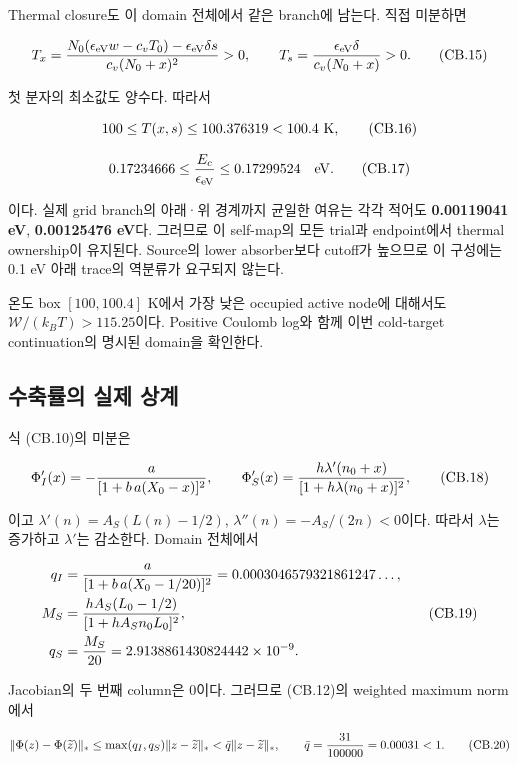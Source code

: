 \documentclass[11pt,a4paper]{article}
\begin{document}
Thermal closure도 이 domain 전체에서 같은 branch에 남는다. 직접 미분하면

\[
 T_x={N_0(\epsilon_{\rm eV}w-c_vT_0)
                  -\epsilon_{\rm eV}\delta s\over c_v(N_0+x)^2}>0,
 \qquad
 T_s={\epsilon_{\rm eV}\delta\over c_v(N_0+x)}>0.
 \tag{CB.15}
\]

첫 분자의 최소값도 양수다. 따라서

\[
 100\le T(x,s)\le100.376319<100.4\ {\rm K},
 \tag{CB.16}
\]

\[
 0.17234666
 \le {E_c\over\epsilon_{\rm eV}}
 \le0.17299524\quad {\rm eV}.
 \tag{CB.17}
\]

이다. 실제 grid branch의 아래·위 경계까지 균일한 여유는 각각 적어도 \textbf{0.00119041 eV}, \textbf{0.00125476 eV}다. 그러므로 이 self-map의 모든 trial과 endpoint에서 thermal ownership이 유지된다. Source의 lower absorber보다 cutoff가 높으므로 이 구성에는 0.1 eV 아래 trace의 역분류가 요구되지 않는다.

온도 box \([100,100.4]\) K에서 가장 낮은 occupied active node에 대해서도 \(\mathcal W/(k_BT)>115.25\)이다. Positive Coulomb log와 함께 이번 cold-target continuation의 명시된 domain을 확인한다.

\hypertarget{uxc218uxcd95uxb960uxc758-uxc2e4uxc81c-uxc0c1uxacc4}{%
\subsection{수축률의 실제 상계}\label{uxc218uxcd95uxb960uxc758-uxc2e4uxc81c-uxc0c1uxacc4}}

식 (CB.10)의 미분은

\[
 \Phi_I'(x)=-{a\over[1+b\,a(X_0-x)]^2},\qquad
 \Phi_S'(x)={h\lambda'(n_0+x)\over[1+h\lambda(n_0+x)]^2},
 \tag{CB.18}
\]

이고 \(\lambda'(n)=A_S(L(n)-1/2)\), \(\lambda''(n)=-A_S/(2n)<0\)이다. 따라서 \(\lambda\)는 증가하고 \(\lambda'\)는 감소한다. Domain 전체에서

\[
 \begin{aligned}
 q_I&={a\over[1+b\,a(X_0-1/20)]^2}
        =0.0003046579321861247\ldots,\\
 M_S&={h A_S(L_0-1/2)\over[1+h A_S n_0L_0]^2},\\
 q_S&={M_S\over20}=2.9138861430824442\times10^{-9}.
 \end{aligned}\tag{CB.19}
\]

Jacobian의 두 번째 column은 0이다. 그러므로 (CB.12)의 weighted maximum norm에서

\[
 \|\Phi(z)-\Phi(\widetilde z)\|_*
 \le\max(q_I,q_S)\|z-\widetilde z\|_*
 <\bar q\|z-\widetilde z\|_*,\qquad
 \bar q={31\over100000}=0.00031<1.
 \tag{CB.20}
\]
\end{document}
